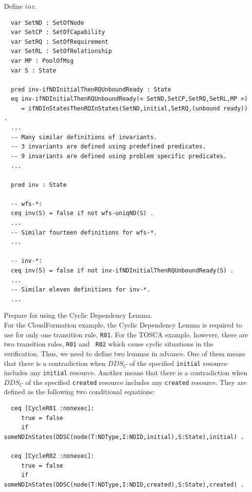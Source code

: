 \documentclass[12pt]{report}
\begin{document}
 Define $inv$. 
\small
\begin{verbatim}
  var SetND : SetOfNode
  var SetCP : SetOfCapability
  var SetRQ : SetOfRequirement
  var SetRL : SetOfRelationship
  var MP : PoolOfMsg
  var S : State

  pred inv-ifNDInitialThenRQUnboundReady : State
  eq inv-ifNDInitialThenRQUnboundReady(< SetND,SetCP,SetRQ,SetRL,MP >)
     = ifNDInStatesThenRQInStates(SetND,initial,SetRQ,(unbound ready)) .
  ...
  -- Many similar definitions of invariants.
  -- 3 invariants are defined using predefined predicates.
  -- 9 invariants are defined using problem specific predicates.
  ...

  pred inv : State

  -- wfs-*:
  ceq inv(S) = false if not wfs-uniqND(S) .
  ...
  -- Similar fourteen definitions for wfs-*.  
  ...

  -- inv-*:
  ceq inv(S) = false if not inv-ifNDInitialThenRQUnboundReady(S) .
  ...
  -- Similar eleven definitions for inv-*.  
  ...

\end{verbatim}
\normalsize

 Prepare for using the Cyclic Dependency
Lemma. \\
For the CloudFormation example, the Cyclic Dependency Lemma is
required to use for only one transition rule, {\tt R01}. For
the TOSCA example, however, there are two transition rules, {\tt R01} and {\tt
  R02} which cause cyclic situations in the verification. Thus, we
need to define two lemmas in advance.  One of them means that there is
a contradiction when $DDS\!_C$ of the specified {\tt initial} resource
includes any {\tt initial} resource.  Another means that there is a
contradiction when $DDS\!_C$ of the specified {\tt created} resource
includes any {\tt created} resource.  They are defined as the
following two conditional equations:
\small
\begin{verbatim}
  ceq [CycleR01 :nonexec]: 
     true = false
     if someNDInStates(DDSC(node(T:NDType,I:NDID,initial),S:State),initial) .

  ceq [CycleR02 :nonexec]: 
     true = false
     if someNDInStates(DDSC(node(T:NDType,I:NDID,created),S:State),created) .

\end{verbatim}
\normalsize
\end{document}
